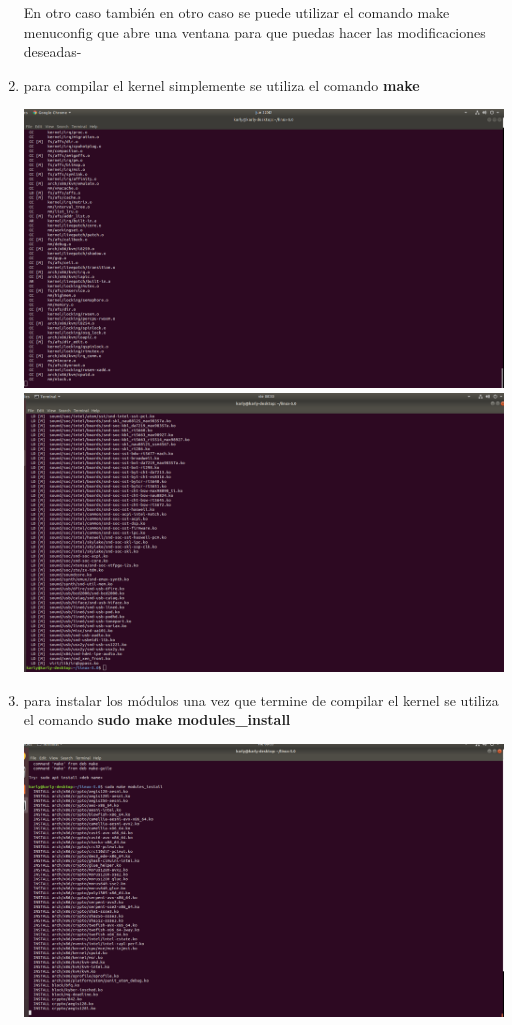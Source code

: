 \documentclass[a4paper, 11pt, oneside]{article}
\begin{document}
\begin{enumerate}
\begin{itemize}
    \end{itemize}
    En otro caso también en otro caso se puede utilizar el comando 
    make menuconfig que abre una ventana para que puedas hacer las modificaciones deseadas-
    \item para compilar el kernel simplemente se utiliza el comando \textbf{make}
    \begin{center}
        \includegraphics[scale=0.15]{compilacion.png}
        \includegraphics[scale=0.18]{compilacion0.png}
    \end{center}
    \item para instalar los módulos una vez que termine de compilar el kernel se utiliza el comando \textbf{sudo make modules\_install}
    \begin{center}
        \includegraphics[scale=0.18]{Instalacionmodulos.png}

\end{center}
\end{enumerate}
\end{document}
